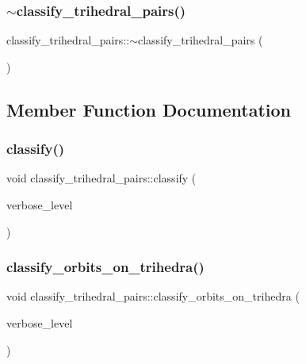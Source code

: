 \subsubsection{\texorpdfstring{$\sim$classify\+\_\+trihedral\+\_\+pairs()}{~classify\_trihedral\_pairs()}}
{\footnotesize\ttfamily classify\+\_\+trihedral\+\_\+pairs\+::$\sim$classify\+\_\+trihedral\+\_\+pairs (\begin{DoxyParamCaption}{ }\end{DoxyParamCaption})}



\subsection{Member Function Documentation}
\mbox{\label{classclassify__trihedral__pairs_a134e4c3042163c24bf57050f26e364e1}} 
\subsubsection{\texorpdfstring{classify()}{classify()}}
{\footnotesize\ttfamily void classify\+\_\+trihedral\+\_\+pairs\+::classify (\begin{DoxyParamCaption}\item[{\mbox{\hyperlink{galois_8h_a09fddde158a3a20bd2dcadb609de11dc}{I\+NT}}}]{verbose\+\_\+level }\end{DoxyParamCaption})}

\mbox{\label{classclassify__trihedral__pairs_a99625621bfba4bb65b3d60304b306539}} 
\subsubsection{\texorpdfstring{classify\+\_\+orbits\+\_\+on\+\_\+trihedra()}{classify\_orbits\_on\_trihedra()}}
{\footnotesize\ttfamily void classify\+\_\+trihedral\+\_\+pairs\+::classify\+\_\+orbits\+\_\+on\+\_\+trihedra (\begin{DoxyParamCaption}\item[{\mbox{\hyperlink{galois_8h_a09fddde158a3a20bd2dcadb609de11dc}{I\+NT}}}]{verbose\+\_\+level }\end{DoxyParamCaption})}


